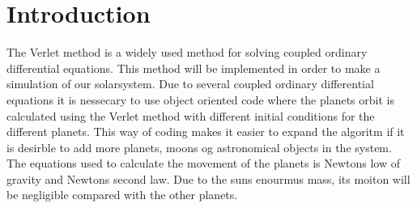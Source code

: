 \documentclass[../main.tex]{subfiles}
\begin{document}
\section{Introduction}\label{introduction}
The Verlet method is a widely used method for solving coupled ordinary differential equations. This method will be implemented  in order to make a simulation of our solarsystem.  Due to several coupled ordinary differential equations it is nessecary to use object oriented code where the planets orbit is calculated using the Verlet method with different initial conditions for the different planets. This way of coding makes it easier to expand the algoritm if it is desirble to add more planets, moons og astronomical objects in the system. The equations used to calculate the movement of the planets is Newtons low of gravity and Newtons second law. Due to the suns enourmus mass, its moiton will be negligible compared with the other planets. 
\end{document}
